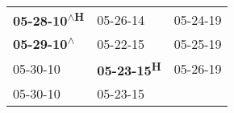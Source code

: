 \begin{supertabular}{lll}
 \textbf{05-28-10\textsuperscript{$\wedge$H}} &                    05-26-14\textsuperscript{} &            05-24-19\textsuperscript{} \\
  \textbf{05-29-10\textsuperscript{$\wedge$}} &                    05-22-15\textsuperscript{} &            05-25-19\textsuperscript{} \\
                   05-30-10\textsuperscript{} &          \textbf{05-23-15\textsuperscript{H}} &            05-26-19\textsuperscript{} \\
                   05-30-10\textsuperscript{} &                    05-23-15\textsuperscript{} &                                       \\
\end{supertabular}
